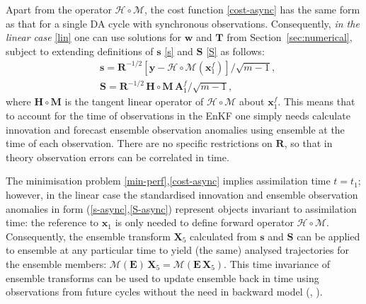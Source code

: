 \documentclass[11pt]{report}
\newcommand{\mb} {\mathbf}
\begin{document}
Apart from the operator $\mathcal H \circ \mathcal M$, the cost function \eqref{cost-async} has the same form as that for a single DA cycle with synchronous observations.
Consequently, \emph{in the linear case} \eqref{lin} one can use solutions for $\mb w$ and $\mb T$ from Section~\ref{sec:numerical}, subject to extending definitions of $\mb s$ \eqref{s} and $\mb S$ \eqref{S} as follows:
\begin{align}
  \label{s-async}
  &\mb s = \mb R^{-1/2} \left[ \mb y - \mathcal H \circ \mathcal M (\mb x_1^f) \right] / \sqrt{m - 1},\\
  \label{S-async}
  &\mb S = \mb R^{-1/2} \, \mb H \circ \mb M \, \mb A_1^f / \sqrt{m - 1},
\end{align}
where $\mb H \circ \mb M$ is the tangent linear operator of $\mathcal H \circ \mathcal M$ about $\mb x_1^f$.
This means that to account for the time of observations in the EnKF one simply needs calculate innovation and forecast ensemble observation anomalies using ensemble at the time of each observation.
There are no specific restrictions on $\mb R$, so that in theory observation errors can be correlated in time.

The minimisation problem \eqref{min-perf},\eqref{cost-async} implies assimilation time $t = t_1$; however, in the linear case the standardised innovation and ensemble observation anomalies in form (\ref{s-async},\ref{S-async}) represent objects invariant to assimilation time: the reference to $\mb x_1$ is only needed to define forward operator $\mathcal H \circ \mathcal M$.
Consequently, the ensemble transform $\mb X_5$ calculated from $\mb s$ and $\mb S$ can be applied to ensemble at any particular time to yield (the same) analysed trajectories for the ensemble members: $\mathcal M (\mb E) \, \mb X_5 = \mathcal M (\mb E \, \mb X_5)$.
This time invariance of ensemble transforms can be used to update ensemble back in time using observations from future cycles without the need in backward model (\citealt[][Sec.~6]{eve00a}, \citealt[][app.~D]{eve03a}).
\end{document}
